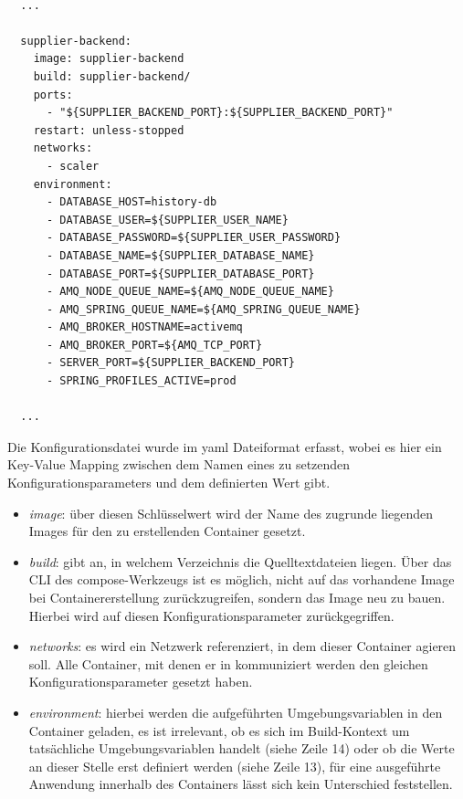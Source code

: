 \begin{lstlisting}[style=bashStyle,caption={Docker Compose - Ausschnitt Supplier Definition},label=lst:dockerCompose]

  ...

  supplier-backend:
    image: supplier-backend
    build: supplier-backend/
    ports:
      - "${SUPPLIER_BACKEND_PORT}:${SUPPLIER_BACKEND_PORT}"
    restart: unless-stopped
    networks:
      - scaler
    environment:
      - DATABASE_HOST=history-db
      - DATABASE_USER=${SUPPLIER_USER_NAME}
      - DATABASE_PASSWORD=${SUPPLIER_USER_PASSWORD}
      - DATABASE_NAME=${SUPPLIER_DATABASE_NAME}
      - DATABASE_PORT=${SUPPLIER_DATABASE_PORT}
      - AMQ_NODE_QUEUE_NAME=${AMQ_NODE_QUEUE_NAME}
      - AMQ_SPRING_QUEUE_NAME=${AMQ_SPRING_QUEUE_NAME}
      - AMQ_BROKER_HOSTNAME=activemq
      - AMQ_BROKER_PORT=${AMQ_TCP_PORT}
      - SERVER_PORT=${SUPPLIER_BACKEND_PORT}
      - SPRING_PROFILES_ACTIVE=prod
  
  ...

\end{lstlisting}
Die Konfigurationsdatei wurde im yaml Dateiformat erfasst, wobei es hier ein Key-Value Mapping zwischen dem Namen eines zu setzenden Konfigurationsparameters und dem definierten Wert gibt.

\begin{itemize}
  \item \emph{image}: über diesen Schlüsselwert wird der Name des zugrunde liegenden Images für den zu erstellenden Container gesetzt.
  \item \emph{build}: gibt an, in welchem Verzeichnis die Quelltextdateien liegen. Über das CLI des compose-Werkzeugs ist es möglich, nicht auf das vorhandene Image bei Containererstellung zurückzugreifen, sondern das Image neu zu bauen. Hierbei wird auf diesen Konfigurationsparameter zurückgegriffen.
  \item \emph{networks}: es wird ein Netzwerk referenziert, in dem dieser Container agieren soll. Alle Container, mit denen er in kommuniziert werden den gleichen Konfigurationsparameter gesetzt haben. 
  \item \emph{environment}: hierbei werden die aufgeführten Umgebungsvariablen in den Container geladen, es ist irrelevant, ob es sich im Build-Kontext um tatsächliche Umgebungsvariablen handelt (siehe Zeile 14) oder ob die Werte an dieser Stelle erst definiert werden (siehe Zeile 13), für eine ausgeführte Anwendung innerhalb des Containers lässt sich kein Unterschied feststellen.
\end{itemize}

